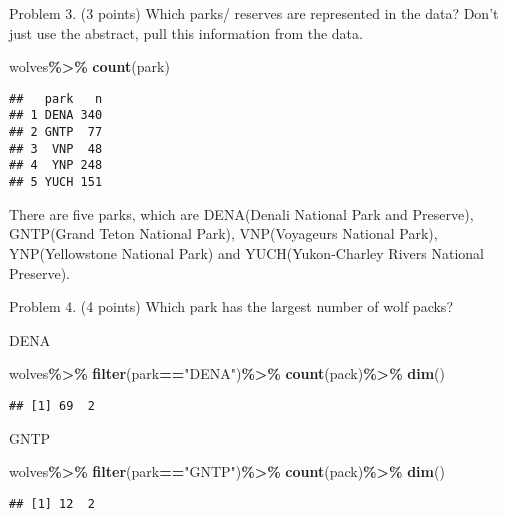 \documentclass[
]{article}
\newenvironment{Shaded}{\begin{snugshade}}{\end{snugshade}}
\newcommand{\FunctionTok}[1]{\textcolor[rgb]{0.13,0.29,0.53}{\textbf{#1}}}
\newcommand{\NormalTok}[1]{#1}
\newcommand{\SpecialCharTok}[1]{\textcolor[rgb]{0.81,0.36,0.00}{\textbf{#1}}}
\newcommand{\StringTok}[1]{\textcolor[rgb]{0.31,0.60,0.02}{#1}}
\begin{document}
Problem 3. (3 points) Which parks/ reserves are represented in the data?
Don't just use the abstract, pull this information from the data.

\begin{Shaded}
\begin{Highlighting}[]
\NormalTok{wolves}\SpecialCharTok{\%\textgreater{}\%}
  \FunctionTok{count}\NormalTok{(park)}
\end{Highlighting}
\end{Shaded}

\begin{verbatim}
##   park   n
## 1 DENA 340
## 2 GNTP  77
## 3  VNP  48
## 4  YNP 248
## 5 YUCH 151
\end{verbatim}

There are five parks, which are DENA(Denali National Park and Preserve),
GNTP(Grand Teton National Park), VNP(Voyageurs National Park),
YNP(Yellowstone National Park) and YUCH(Yukon-Charley Rivers National
Preserve).

Problem 4. (4 points) Which park has the largest number of wolf packs?

DENA

\begin{Shaded}
\begin{Highlighting}[]
\NormalTok{wolves}\SpecialCharTok{\%\textgreater{}\%}
  \FunctionTok{filter}\NormalTok{(park}\SpecialCharTok{==}\StringTok{"DENA"}\NormalTok{)}\SpecialCharTok{\%\textgreater{}\%}
  \FunctionTok{count}\NormalTok{(pack)}\SpecialCharTok{\%\textgreater{}\%}
  \FunctionTok{dim}\NormalTok{()}
\end{Highlighting}
\end{Shaded}

\begin{verbatim}
## [1] 69  2
\end{verbatim}

GNTP

\begin{Shaded}
\begin{Highlighting}[]
\NormalTok{wolves}\SpecialCharTok{\%\textgreater{}\%}
  \FunctionTok{filter}\NormalTok{(park}\SpecialCharTok{==}\StringTok{"GNTP"}\NormalTok{)}\SpecialCharTok{\%\textgreater{}\%}
  \FunctionTok{count}\NormalTok{(pack)}\SpecialCharTok{\%\textgreater{}\%}
  \FunctionTok{dim}\NormalTok{()}
\end{Highlighting}
\end{Shaded}

\begin{verbatim}
## [1] 12  2
\end{verbatim}
\end{document}
